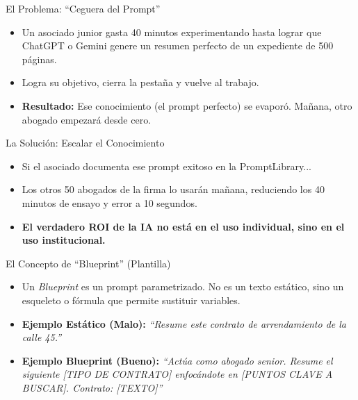 \documentclass[aspectratio=169]{beamer}
\begin{document}
\begin{frame}{El Problema: ``Ceguera del Prompt''}

\begin{itemize}
  \item Un asociado junior gasta 40 minutos experimentando hasta lograr que ChatGPT o Gemini genere un resumen perfecto de un expediente de 500 páginas.
  \item Logra su objetivo, cierra la pestaña y vuelve al trabajo.
  \item \textbf{Resultado:} Ese conocimiento (el prompt perfecto) se evaporó. Mañana, otro abogado empezará desde cero.
\end{itemize}
\end{frame}

\begin{frame}{La Solución: Escalar el Conocimiento}

\begin{itemize}
  \item Si el asociado documenta ese prompt exitoso en la PromptLibrary...
  \item Los otros 50 abogados de la firma lo usarán mañana, reduciendo los 40 minutos de ensayo y error a 10 segundos.
  \item \textbf{El verdadero ROI de la IA no está en el uso individual, sino en el uso institucional.}
\end{itemize}
\end{frame}

\begin{frame}{El Concepto de ``Blueprint'' (Plantilla)}

\begin{itemize}
  \item Un \textit{Blueprint} es un prompt parametrizado. No es un texto estático, sino un esqueleto o fórmula que permite sustituir variables.
  \item \textbf{Ejemplo Estático (Malo):} \textit{``Resume este contrato de arrendamiento de la calle 45.''}
  \item \textbf{Ejemplo Blueprint (Bueno):} \textit{``Actúa como abogado senior. Resume el siguiente [TIPO DE CONTRATO] enfocándote en [PUNTOS CLAVE A BUSCAR]. Contrato: [TEXTO]''}
\end{itemize}
\end{frame}
\end{document}
